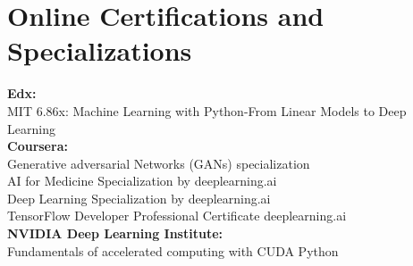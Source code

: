 \documentclass[letterpaper,11pt]{article}
\newcommand{\resumeSubHeadingListStart}{\begin{itemize}[leftmargin=0.15in, label={}]}
\newcommand{\resumeSubHeadingListEnd}{\end{itemize}}
\begin{document}
\section{Online Certifications and Specializations}
  \vspace{1pt}
  \resumeSubHeadingListStart
    \small{\item{
		    \textbf{Edx:\\}{MIT 6.86x: Machine Learning with Python-From Linear Models to Deep Learning}
		\textbf{\vspace{2pt}\\Coursera:\\}{Generative adversarial Networks (GANs) specialization\\AI for Medicine Specialization by deeplearning.ai\\Deep Learning Specialization by deeplearning.ai\\TensorFlow Developer Professional Certificate deeplearning.ai}
		\textbf{\vspace{2pt}\\NVIDIA Deep Learning Institute:\\}{Fundamentals of accelerated computing with CUDA Python}


                }
        }
  \resumeSubHeadingListEnd
\end{document}

